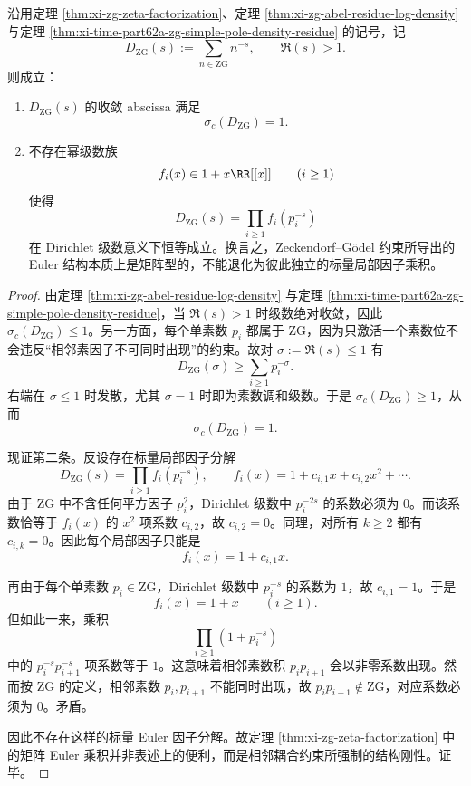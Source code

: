 \begin{conclusion}\label{con:xi-time-part62b-zg-critical-exponent-matrix-euler-rigidity}
沿用定理 \ref{thm:xi-zg-zeta-factorization}、定理 \ref{thm:xi-zg-abel-residue-log-density} 与定理 \ref{thm:xi-time-part62a-zg-simple-pole-density-residue} 的记号，记
\[
D_{\mathrm{ZG}}(s):=\sum_{n\in \mathrm{ZG}}n^{-s},
\qquad
\Re(s)>1.
\]
则成立：
\begin{enumerate}
  \item \(D_{\mathrm{ZG}}(s)\) 的收敛 abscissa 满足
  \[
  \sigma_c(D_{\mathrm{ZG}})=1.
  \]
  \item 不存在幂级数族
  \[
  f_i(x)\in 1+x\RR[[x]]
  \qquad (i\ge 1)
  \]
  使得
  \[
  D_{\mathrm{ZG}}(s)=\prod_{i\ge 1}f_i(p_i^{-s})
  \]
  在 Dirichlet 级数意义下恒等成立。换言之，Zeckendorf--Gödel 约束所导出的 Euler 结构本质上是矩阵型的，不能退化为彼此独立的标量局部因子乘积。
\end{enumerate}
\end{conclusion}
\begin{proof}
由定理 \ref{thm:xi-zg-abel-residue-log-density} 与定理 \ref{thm:xi-time-part62a-zg-simple-pole-density-residue}，当 \(\Re(s)>1\) 时级数绝对收敛，因此 \(\sigma_c(D_{\mathrm{ZG}})\le 1\)。另一方面，每个单素数 \(p_i\) 都属于 \(\mathrm{ZG}\)，因为只激活一个素数位不会违反“相邻素因子不可同时出现”的约束。故对 \(\sigma:=\Re(s)\le 1\) 有
\[
D_{\mathrm{ZG}}(\sigma)\ge \sum_{i\ge 1}p_i^{-\sigma}.
\]
右端在 \(\sigma\le 1\) 时发散，尤其 \(\sigma=1\) 时即为素数调和级数。于是 \(\sigma_c(D_{\mathrm{ZG}})\ge 1\)，从而
\[
\sigma_c(D_{\mathrm{ZG}})=1.
\]

现证第二条。反设存在标量局部因子分解
\[
D_{\mathrm{ZG}}(s)=\prod_{i\ge 1}f_i(p_i^{-s}),
\qquad
f_i(x)=1+c_{i,1}x+c_{i,2}x^2+\cdots .
\]
由于 \(\mathrm{ZG}\) 中不含任何平方因子 \(p_i^2\)，Dirichlet 级数中 \(p_i^{-2s}\) 的系数必须为 \(0\)。而该系数恰等于 \(f_i(x)\) 的 \(x^2\) 项系数 \(c_{i,2}\)，故 \(c_{i,2}=0\)。同理，对所有 \(k\ge 2\) 都有 \(c_{i,k}=0\)。因此每个局部因子只能是
\[
f_i(x)=1+c_{i,1}x.
\]

再由于每个单素数 \(p_i\in \mathrm{ZG}\)，Dirichlet 级数中 \(p_i^{-s}\) 的系数为 \(1\)，故 \(c_{i,1}=1\)。于是
\[
f_i(x)=1+x
\qquad (i\ge 1).
\]
但如此一来，乘积
\[
\prod_{i\ge 1}(1+p_i^{-s})
\]
中的 \(p_i^{-s}p_{i+1}^{-s}\) 项系数等于 \(1\)。这意味着相邻素数积 \(p_ip_{i+1}\) 会以非零系数出现。然而按 \(\mathrm{ZG}\) 的定义，相邻素数 \(p_i,p_{i+1}\) 不能同时出现，故 \(p_ip_{i+1}\notin \mathrm{ZG}\)，对应系数必须为 \(0\)。矛盾。

因此不存在这样的标量 Euler 因子分解。故定理 \ref{thm:xi-zg-zeta-factorization} 中的矩阵 Euler 乘积并非表述上的便利，而是相邻耦合约束所强制的结构刚性。证毕。
\end{proof}

